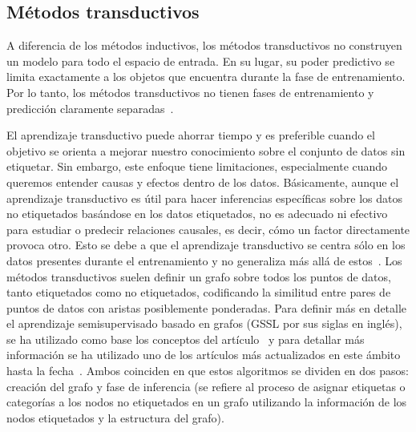 \subsection{Métodos transductivos} \label{sec3:transductivo}
A diferencia de los métodos inductivos, los métodos transductivos no construyen un modelo para todo el espacio de entrada. En su lugar, su poder predictivo se limita exactamente a los objetos que encuentra durante la fase de entrenamiento. Por lo tanto, los métodos transductivos no tienen fases de entrenamiento y predicción claramente separadas~\cite{Engelen:semi-supervised}.

El aprendizaje transductivo puede ahorrar tiempo y es preferible cuando el objetivo se orienta a mejorar nuestro conocimiento sobre el conjunto de datos sin etiquetar. Sin embargo, este enfoque tiene limitaciones, especialmente cuando queremos entender causas y efectos dentro de los datos. Básicamente, aunque el aprendizaje transductivo es útil para hacer inferencias específicas sobre los datos no etiquetados basándose en los datos etiquetados, no es adecuado ni efectivo para estudiar o predecir relaciones causales, es decir, cómo un factor directamente provoca otro. Esto se debe a que el aprendizaje transductivo se centra sólo en los datos presentes durante el entrenamiento y no generaliza más allá de estos~\cite{web:assumptions}.
Los métodos transductivos suelen definir un grafo sobre todos los puntos de datos, tanto etiquetados como no etiquetados, codificando la similitud entre pares de puntos de datos con aristas posiblemente ponderadas. Para definir más en detalle el aprendizaje semisupervisado basado en grafos (GSSL por sus siglas en inglés), se ha utilizado como base los conceptos del artículo~\cite{Engelen:semi-supervised} y para detallar más información se ha utilizado uno de los artículos más actualizados en este ámbito hasta la fecha~\cite{GSSL:review}. Ambos coinciden en que estos algoritmos se dividen en dos pasos: creación del grafo y fase de inferencia (se refiere al proceso de asignar etiquetas o categorías a los nodos no etiquetados en un grafo utilizando la información de los nodos etiquetados y la estructura del grafo).
